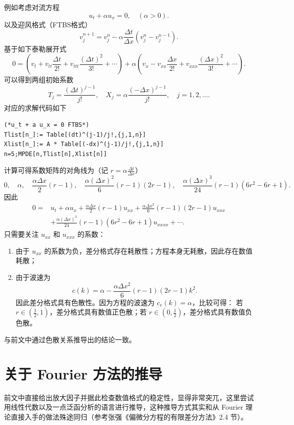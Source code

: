 例如考虑对流方程
\[
    u_t + \alpha u_x = 0,\quad (\alpha >0).
\]
以及迎风格式（FTBS格式）
\[
    v_j^{n+1} = v_j^n - \alpha \frac{\Delta t}{\Delta x}(v_j^n - v_j^{n-1}).
\]
基于如下泰勒展开式
\[
    0 =
    \left(
    v_t + v_{tt} \frac{\Delta t}{2!} + v_{ttt} \frac{(\Delta t)^2}{3!} + \cdots
    \right)
    + \alpha
    \left(
    v_x - v_{xx} \frac{\Delta x}{2!} + v_{xxx} \frac{(\Delta x)^2}{3!} + \cdots
    \right).
\]
可以得到两组初始系数
\[
    T_j = \frac{(\Delta t)^{j-1}}{j!}, \quad X_j = \alpha \frac{(-\Delta x)^{j-1}}{j!}, \quad j = 1,2,\dots.
\]
对应的求解代码如下
\begin{lstlisting}
(*u_t + a u_x = 0 FTBS*)
Tlist[n_]:= Table[(dt)^(j-1)/j!,{j,1,n}]
Xlist[n_]:= A * Table[(-dx)^(j-1)/j!,{j,1,n}]
n=5;MPDE[n,Tlist[n],Xlist[n]]
\end{lstlisting}
计算可得系数矩阵的对角线为（记 $r = \alpha \frac{\Delta t}{\Delta x}$）
\[
    0,\quad \alpha,\quad \frac{\alpha \Delta x}2 (r-1),\quad \frac{\alpha (\Delta x)^2}6(r-1)(2r-1),\quad
    \frac{\alpha (\Delta x)^3}{24}(r-1)(6r^2-6r+1).
\]
因此
\begin{align*}
    0 ={} & u_t + \alpha u_x + \frac{\alpha \Delta x}2 (r-1) u_{xx}
    + \frac{\alpha \Delta x^2}6 (r-1)(2r-1) u_{xxx}                   \\
          & + \frac{\alpha (\Delta x)^3}{24}(r-1)(6r^2-6r+1) u_{xxxx}
    + \cdots.
\end{align*}
只需要关注 $u_{xx}$ 和 $u_{xxx}$ 的系数：
\begin{enumerate}
    \item 由于 $u_{xx}$ 的系数为负，差分格式存在耗散性；方程本身无耗散，因此存在数值耗散；
    \item 由于波速为
          \[
              c(k) = \alpha - \frac{\alpha \Delta x^2}6 (r-1)(2r-1) k^2.
          \]
          因此差分格式具有色散性。因为方程的波速为 $c_e(k) = \alpha$，比较可得：
          若 $r \in (\frac12,1)$，差分格式具有数值正色散；若 $r \in (0,\frac12)$，差分格式具有数值负色散。
\end{enumerate}
与前文中通过色散关系推导出的结论一致。


\section{关于 Fourier 方法的推导}

前文中直接给出放大因子并据此检查数值格式的稳定性，显得非常突兀，这里尝试用线性代数以及一点泛函分析的语言进行推导，这种推导方式其实和从 Fourier 理论直接入手的做法殊途同归（参考张强《偏微分方程的有限差分方法》2.4 节）。

